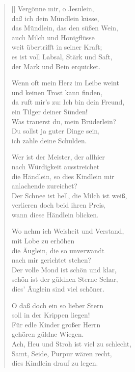 \begin{multicols}{2}
\begin{verse}[\versewidth]
 Vergönne mir, o Jesulein,\\
daß ich dein Mündlein küsse,\\
das Mündlein, das den süßen Wein,\\
auch Milch und Honigflüsse\\
weit übertrifft in seiner Kraft;\\
es ist voll Labsal, Stärk und Saft,\\
der Mark und Bein erquicket.
 
 Wenn oft mein Herz im Leibe weint\\
und keinen Trost kann finden,\\
da ruft mir's zu: Ich bin dein Freund,\\
ein Tilger deiner Sünden!\\
Was trauerst du, mein Brüderlein?\\
Du sollst ja guter Dinge sein,\\
ich zahle deine Schulden.
 
 Wer ist der Meister, der allhier\\
nach Würdigkeit ausstreichet\\
die Händlein, so dies Kindlein mir\\
anlachende zureichet?\\
Der Schnee ist hell, die Milch ist weiß,\\
verlieren doch beid ihren Preis,\\
wann diese Händlein blicken.
 
 Wo nehm ich Weisheit und Verstand,\\
mit Lobe zu erhöhen\\
die Äuglein, die so unverwandt\\
nach mir gerichtet stehen?\\
Der volle Mond ist schön und klar,\\
schön ist der güldnen Sterne Schar,\\
dies' Äuglein sind viel schöner.
 
 O daß doch ein so lieber Stern\\
soll in der Krippen liegen!\\
Für edle Kinder großer Herrn\\
gehören güldne Wiegen.\\
Ach, Heu und Stroh ist viel zu schlecht,\\
Samt, Seide, Purpur wären recht,\\
dies Kindlein drauf zu legen.
 

\end{verse}
\end{multicols}
